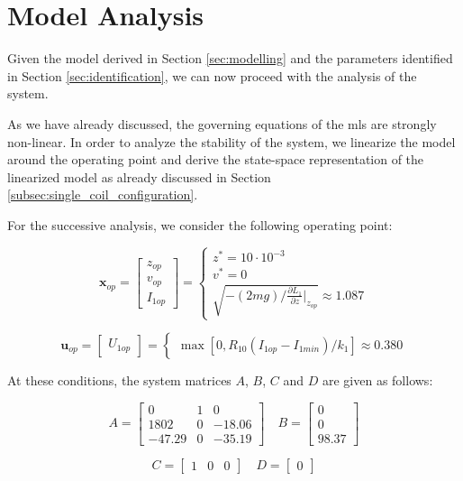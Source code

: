 \section{Model Analysis}
\label{sec:model_analysis}

Given the model derived in Section \ref{sec:modelling} and the parameters identified in Section \ref{sec:identification}, we can now proceed with the analysis of the system.

As we have already discussed, the governing equations of the \acrshort{mls} are strongly non-linear.
In order to analyze the stability of the system, we linearize the model around the operating point and derive the state-space representation of the linearized model as already discussed in Section \ref{subsec:single_coil_configuration}.

For the successive analysis, we consider the following operating point:

\begin{equation}
    \mathbf{x}_{op} =
    \begin{bmatrix}
        z_{op} \\
        v_{op} \\
        I_{1op}
    \end{bmatrix}
    =
    \begin{cases}
        z^* =  10 \cdot 10^{-3} \\
        v^* = 0                 \\
        \sqrt{ -(2m g) / \frac{\partial L_1}{\partial z} \big|_{z_{op}} } \approx 1.087
    \end{cases}
\end{equation}

\begin{equation}
    \mathbf{u}_{op} =
    \begin{bmatrix}
        U_{1op}
    \end{bmatrix}
    =
    \begin{cases}
        \max{\left[0, R_{10} \left( I_{1op} - I_{1min} \right) / k_1 \right]} \approx 0.380
    \end{cases}
\end{equation}

At these conditions, the system matrices $A$, $B$, $C$ and $D$ are given as follows:

\begin{equation}
    A =
    \begin{bmatrix}
        0      & 1 & 0      \\
        1802   & 0 & -18.06 \\
        -47.29 & 0 & -35.19
    \end{bmatrix}
    \quad
    B =
    \begin{bmatrix}
        0 \\
        0 \\
        98.37
    \end{bmatrix}
\end{equation}

\begin{equation}
    C =
    \begin{bmatrix}
        1 & 0 & 0
    \end{bmatrix}
    \quad
    D =
    \begin{bmatrix}
        0
    \end{bmatrix}
\end{equation}


